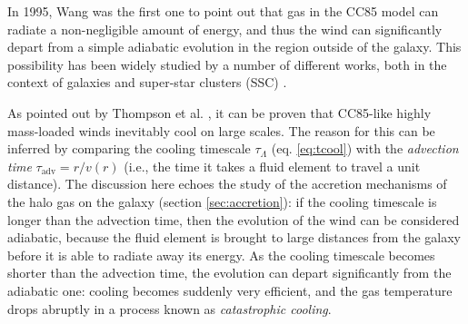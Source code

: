 In 1995, Wang \citep{Wang:1995} was the first one to point out that gas in the CC85 model can radiate a non-negligible amount of energy, and thus the wind can significantly depart from a simple adiabatic evolution in the region outside of the galaxy. This possibility has been widely studied by a number of different works, both in the context of galaxies \citep{McCourt:2015, sarkar:2015, Thompson16, Scannapieco:2017, Schneider:2018, Gronke&Oh:2020, fielding2021} and super-star clusters (SSC) \citep{Silich:2004, tenorio2003supergalactic, tenorio2007hydrodynamics, gray2019catastrophic, danehkar_2021}.


As pointed out by Thompson et al. \citep{Thompson16}, it can be proven that CC85-like highly mass-loaded winds inevitably cool on large scales. The reason for this can be inferred by comparing the cooling timescale $\tau_\Lambda$ (eq. \ref{eq:tcool}) with the \textit{advection time} $\tau_\mathrm{adv} = r / v(r)$ (i.e., the time it takes a fluid element to travel a unit distance). The discussion here echoes the study of the accretion mechanisms of the halo gas on the galaxy (section \ref{sec:accretion}): if the cooling timescale is longer than the advection time, then the evolution of the wind can be considered adiabatic, because the fluid element is brought to large distances from the galaxy before it is able to radiate away its energy. As the cooling timescale becomes shorter than the advection time, the evolution can depart significantly from the adiabatic one: cooling becomes suddenly very efficient, and the gas temperature drops abruptly in a process known as \textit{catastrophic cooling}. 

